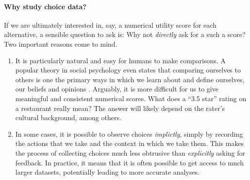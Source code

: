 \paragraph{Why study choice data?}
If we are ultimately interested in, say, a numerical utility score for each alternative, a sensible question to ask is:
Why not \emph{directly} ask for a such a score?
Two important reasons come to mind.
\begin{enumerate}
\item It is particularly natural and easy for humans to make comparisons.
A popular theory in social psychology even states that comparing ourselves to others is one the primary ways in which we learn about and define ourselves, our beliefs and opinions \citep{festinger1954theory}.
Arguably, it is more difficult for us to give meaningful and consistent numerical scores.
What does a ``3.5 star'' rating on a restaurant really mean? The answer will likely depend on the rater's cultural background, among others.

\item In some cases, it is possible to observe choices \emph{implictly}, simply by recording the actions that we take and the context in which we take them.
This makes the process of collecting choices much less obtrusive than \emph{explicitly} asking for feedback.
In practice, it means that it is often possible to get access to much larger datasets, potentially leading to more accurate analyses.
\end{enumerate}



